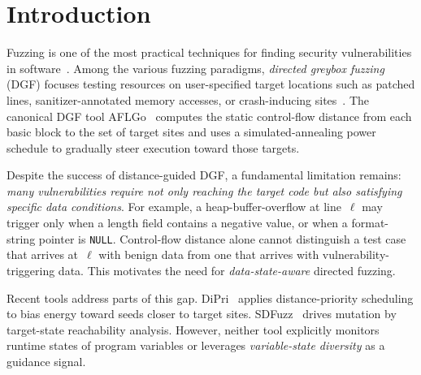 \documentclass[preprint,12pt,3p]{elsarticle}
\begin{document}
\linenumbers

\section{Introduction}
\label{sec:intro}

Fuzzing is one of the most practical techniques for finding security
vulnerabilities in software~\cite{manes2019art}.  Among the various fuzzing
paradigms, \emph{directed greybox fuzzing} (DGF) focuses testing resources on
user-specified target locations such as patched lines, sanitizer-annotated
memory accesses, or crash-inducing sites~\cite{bohme2017directed}.  The
canonical DGF tool AFLGo~\cite{bohme2017directed} computes the static
control-flow distance from each basic block to the set of target sites and
uses a simulated-annealing power schedule to gradually steer execution toward
those targets.

Despite the success of distance-guided DGF, a fundamental limitation remains:
\emph{many vulnerabilities require not only reaching the target code but also
satisfying specific data conditions}.  For example, a heap-buffer-overflow at
line~$\ell$ may trigger only when a length field contains a negative value, or
when a format-string pointer is \texttt{NULL}.  Control-flow distance alone
cannot distinguish a test case that arrives at~$\ell$ with benign data from one
that arrives with vulnerability-triggering data.  This motivates the need for
\emph{data-state-aware} directed fuzzing.

Recent tools address parts of this gap.  DiPri~\cite{dipri2023} applies
distance-priority scheduling to bias energy toward seeds closer to target
sites.  SDFuzz~\cite{sdfuzz2023} drives mutation by target-state reachability
analysis.  However, neither tool explicitly monitors runtime states of
program variables or leverages \emph{variable-state diversity} as a guidance
signal.
\end{document}
